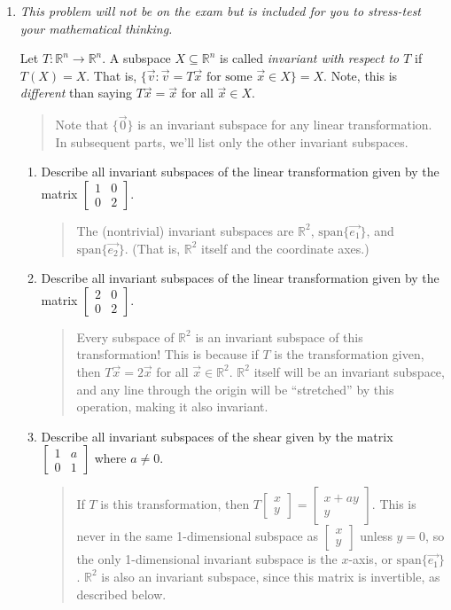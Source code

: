 \documentclass[letter]{article}
\newcommand{\R}{\mathbb{R}}
\newcommand{\Span}{\mathrm{span}}
\newcommand{\mat}[1]{\begin{bmatrix}#1\end{bmatrix}}
\begin{document}
\begin{enumerate}
\begin{enumerate}
		\end{enumerate}

	\item {\it This problem will not be on the exam but is included for you to stress-test your
		mathematical thinking.}
		
		Let $T:\R^n\to\R^n$. A subspace $X\subseteq \R^n$ is called \emph{invariant with respect to $T$} if $T(X)=X$.  That is,
		       $\{\vec v:\vec v=T\vec x\text{ for some }\vec x\in X\}=X$.  Note, this is \emph{different} than saying $T\vec x=\vec x$ for all $\vec x\in X$.
				\begin{quote}
					Note that $\{\vec{0}\}$ is an invariant subspace for any linear transformation.  In subsequent parts, we'll list only the other invariant subspaces.
				\end{quote}
		\begin{enumerate}
		       \item Describe all invariant subspaces of the linear transformation given by the matrix $\mat{1&0\\0&2}$.
			       \begin{quote}
				       The (nontrivial) invariant subspaces are $\R^2$, $\Span \{ \vec{e_1} \}$, and $\Span \{\vec{e_2}\}$.  (That is, $\R^2$ itself and the coordinate axes.)
				   \end{quote}
		       \item Describe all invariant subspaces of the linear transformation given by the matrix $\mat{2&0\\0&2}$.
			       \begin{quote}
				       Every subspace of $\R^2$ is an invariant subspace of this transformation!  This is because if $T$ is the transformation given, then $T\vec{x} = 2 \vec{x}$ for all $\vec{x} \in \R^2$.  $\R^2$ itself will be an invariant subspace, and any line through the origin will be ``stretched'' by this operation, making it also invariant.
				   \end{quote}
		       \item Describe all invariant subspaces of the shear given by the matrix $\mat{1&a\\0&1}$ where $a\neq 0$.
			       \begin{quote}
				       If $T$ is this transformation, then $T \mat{x\\y} = \mat{x + ay \\ y}$.  This is never in the same 1-dimensional subspace as $\mat{x\\y}$ unless $y=0$, so the only 1-dimensional invariant subspace is the $x$-axis, or $\Span \{\vec{e_1}\}$.  $\R^2$ is also an invariant subspace, since this matrix is invertible, as described below.

\end{quote}
\end{enumerate}
\end{enumerate}
\end{document}
